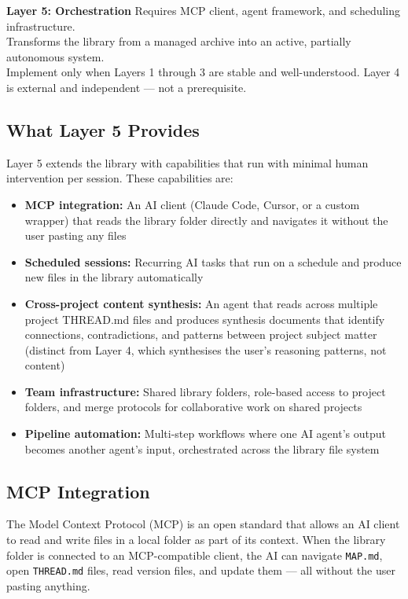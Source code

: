 \documentclass[12pt,letterpaper]{article}
\begin{document}
\begin{layerbox5}
\textbf{Layer 5: Orchestration} \quad Requires MCP client, agent framework, and scheduling infrastructure.\\
Transforms the library from a managed archive into an active, partially autonomous system.\\
Implement only when Layers 1 through 3 are stable and well-understood.
Layer 4 is external and independent --- not a prerequisite.
\end{layerbox5}

\subsection{What Layer 5 Provides}

Layer 5 extends the library with capabilities that run with minimal
human intervention per session. These capabilities are:

\begin{itemize}
  \item \textbf{MCP integration:} An AI client (Claude Code, Cursor, or
        a custom wrapper) that reads the library folder directly and
        navigates it without the user pasting any files
  \item \textbf{Scheduled sessions:} Recurring AI tasks that run on a
        schedule and produce new files in the library automatically
  \item \textbf{Cross-project content synthesis:} An agent that reads
        across multiple project THREAD.md files and produces synthesis
        documents that identify connections, contradictions, and
        patterns between project subject matter (distinct from Layer 4,
        which synthesises the user's reasoning patterns, not content)
  \item \textbf{Team infrastructure:} Shared library folders, role-based
        access to project folders, and merge protocols for collaborative
        work on shared projects
  \item \textbf{Pipeline automation:} Multi-step workflows where one
        AI agent's output becomes another agent's input, orchestrated
        across the library file system
\end{itemize}

\subsection{MCP Integration}

The Model Context Protocol (MCP) is an open standard that allows an AI
client to read and write files in a local folder as part of its context.
When the library folder is connected to an MCP-compatible client, the AI
can navigate \texttt{MAP.md}, open \texttt{THREAD.md} files, read version
files, and update them --- all without the user pasting anything.
\end{document}
